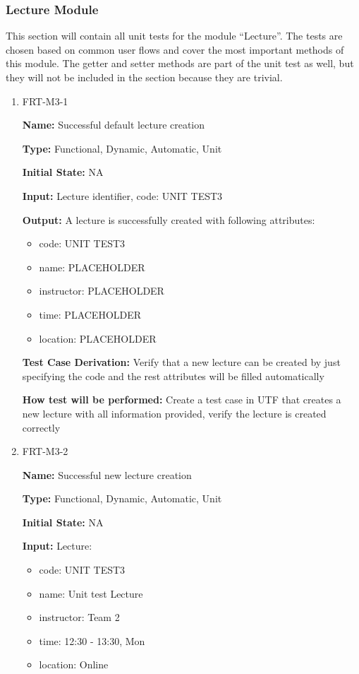 \documentclass[12pt, titlepage]{article}
\begin{document}
\subsubsection{Lecture Module}

This section will contain all unit tests for the module ``Lecture''. The tests are chosen based on common user flows and cover the most important methods of this module. The getter and setter methods are part of the unit test as well, but they will not be included in the section because they are trivial.

\begin{enumerate}
\item{FRT-M3-1}

\textbf{Name:} Successful default lecture creation

\textbf{Type:} Functional, Dynamic, Automatic, Unit
					
\textbf{Initial State:} NA
					
\textbf{Input:} Lecture identifier, code: UNIT TEST3
					
\textbf{Output:} A lecture is successfully created with following attributes:
\begin{itemize}
\item code: UNIT TEST3
\item name: PLACEHOLDER
\item instructor: PLACEHOLDER
\item time: PLACEHOLDER
\item location: PLACEHOLDER
\end{itemize}

\textbf{Test Case Derivation:} Verify that a new lecture can be created by just specifying the code and the rest attributes will be filled automatically

\textbf{How test will be performed:} Create a test case in UTF that creates a new lecture with all information provided, verify the lecture is created correctly

\item{FRT-M3-2}

\textbf{Name:} Successful new lecture creation

\textbf{Type:} Functional, Dynamic, Automatic, Unit
					
\textbf{Initial State:} NA
					
\textbf{Input:} Lecture:
\begin{itemize}
\item code: UNIT TEST3
\item name: Unit test Lecture
\item instructor: Team 2
\item time: 12:30 - 13:30, Mon
\item location: Online
\end{itemize}
					

\end{enumerate}
\end{document}
